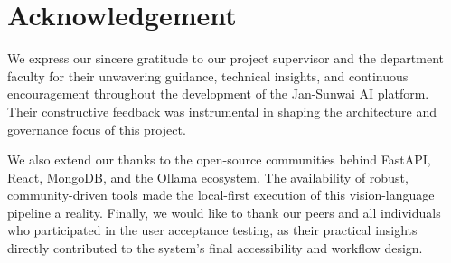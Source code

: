 \chapter*{Acknowledgement}

We express our sincere gratitude to our project supervisor and the department faculty for their unwavering guidance, technical insights, and continuous encouragement throughout the development of the Jan-Sunwai AI platform. Their constructive feedback was instrumental in shaping the architecture and governance focus of this project.

We also extend our thanks to the open-source communities behind FastAPI, React, MongoDB, and the Ollama ecosystem. The availability of robust, community-driven tools made the local-first execution of this vision-language pipeline a reality. Finally, we would like to thank our peers and all individuals who participated in the user acceptance testing, as their practical insights directly contributed to the system's final accessibility and workflow design.
